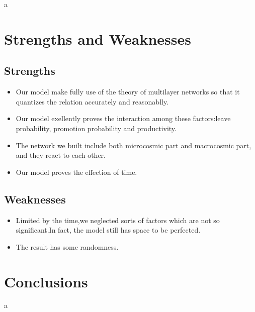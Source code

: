 \documentclass[12pt,a4paper,titlepage]{article}
\begin{document}
a

\section{Strengths and Weaknesses}
\label{sec:strengths-and-weaknesses}

\subsection*{Strengths}
\label{sec:strengths}

\begin{itemize}
\item Our model make fully use of the theory of multilayer networks so
  that it quantizes the relation accurately and reasonablly.
\item Our model exellently proves the interaction among these
  factors:leave probability, promotion probability and productivity.
\item The network we built include both microcosmic part and
  macrocosmic part, and they react to each other.
\item Our model proves the effection of time.
\end{itemize}

\subsection*{Weaknesses}
\label{sec:weaknesses}

\begin{itemize}
\item Limited by the time,we neglected sorts of factors which are not so significant.In fact, the model still has space to be perfected.
\item The result has some randomness.
\end{itemize}

\section{Conclusions}
\label{sec:conclusions}

a

\begin{thebibliography}{99}

\bibitem{}

\end{thebibliography}

\label{LastPage}
\end{document}
